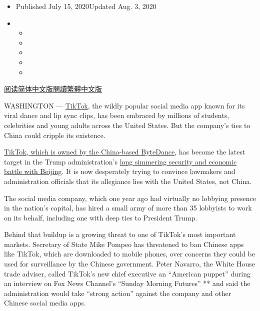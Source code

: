 \begin{itemize}
\item
  Published July 15, 2020Updated Aug. 3, 2020
\item
  \begin{itemize}
  \item
  \item
  \item
  \item
  \item
  \end{itemize}
\end{itemize}

\href{https://cn.nytimes3xbfgragh.onion/technology/20200716/tiktok-washington-lobbyist/}{阅读简体中文版}\href{https://cn.nytimes3xbfgragh.onion/technology/20200716/tiktok-washington-lobbyist/zh-hant/}{閱讀繁體中文版}

WASHINGTON ---
\href{https://www.nytimes3xbfgragh.onion/2020/08/01/technology/tiktok-trump-microsoft-bytedance-china-ban.html}{TikTok},
the wildly popular social media app known for its viral dance and lip
sync clips, has been embraced by millions of students, celebrities and
young adults across the United States. But the company's ties to China
could cripple its existence.

\href{https://www.nytimes3xbfgragh.onion/2020/08/03/technology/tiktok-trump-sale-microsoft.html}{TikTok,
which is owned by the China-based ByteDance}, has become the latest
target in the Trump administration's
\href{https://www.nytimes3xbfgragh.onion/2020/01/20/business/economy/trump-us-china-deal-micron-trade-war.html}{long
simmering security and economic battle with Beijing}. It is now
desperately trying to convince lawmakers and administration officials
that its allegiance lies with the United States, not China.

The social media company, which one year ago had virtually no lobbying
presence in the nation's capital, has hired a small army of more than 35
lobbyists to work on its behalf, including one with deep ties to
President Trump.

Behind that buildup is a growing threat to one of TikTok's most
important markets. Secretary of State Mike Pompeo has threatened to ban
Chinese apps like TikTok, which are downloaded to mobile phones, over
concerns they could be used for surveillance by the Chinese government.
Peter Navarro, the White House trade adviser, called TikTok's new chief
executive an ``American puppet'' during an interview on Fox News
Channel's ``Sunday Morning Futures'' ** and said the administration
would take ``strong action'' against the company and other Chinese
social media apps.

